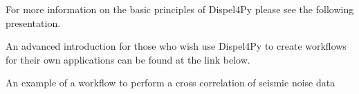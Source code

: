 \documentclass[english]{book}
\begin{document}

For more information on the basic principles of Dispel4Py please see the
following presentation.


An advanced introduction for those who wish use Dispel4Py to create
workflows for their own applications can be found at the link below.



 An example of a workflow to perform a cross
correlation of seismic noise data



\renewcommand{\indexname}{Index}
\printindex
\end{document}
